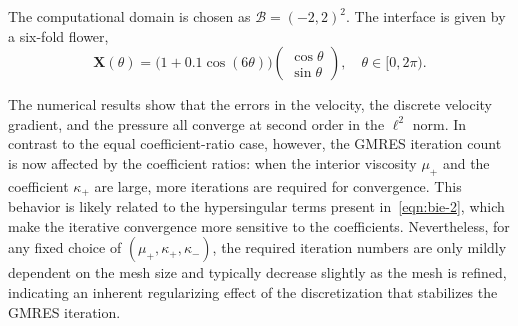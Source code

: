 \documentclass[preprint,11pt]{elsarticle}
\theoremstyle{remark}
\newcommand{\grad}[1]{\nabla #1}
\newcommand{\mc}[1]{\mathcal{#1}}
\newcommand{\bm}[1]{\boldsymbol{#1}}
\newcommand{\norm}[1]{\left\lVert #1 \right\rVert}
\begin{document}
The computational domain is chosen as $\mc B = (-2,2)^2$.
The interface is given by a six-fold flower,
\begin{equation}
    \bm X(\theta) = \bigl(1 + 0.1 \cos (6\theta)\bigr) 
    \begin{pmatrix}
        \cos \theta\\[2pt]
        \sin \theta
    \end{pmatrix},\quad 
    \theta\in [0, 2\pi).
\end{equation}

The numerical results show that the errors in the velocity, the discrete velocity gradient,
and the pressure all converge at second order in the $\ell^2$ norm.
In contrast to the equal coefficient-ratio case, however, the GMRES iteration count is now
affected by the coefficient ratios: when the interior viscosity $\mu_+$ and the coefficient
$\kappa_+$ are large, more iterations are required for convergence.
This behavior is likely related to the hypersingular terms present in~\eqref{eqn:bie-2},
which make the iterative convergence more sensitive to the coefficients.
Nevertheless, for any fixed choice of $(\mu_+,\kappa_+,\kappa_-)$, the required iteration
numbers are only mildly dependent on the mesh size and typically decrease slightly as the
mesh is refined, indicating an inherent regularizing effect of the discretization that
stabilizes the GMRES iteration.


\end{document}

